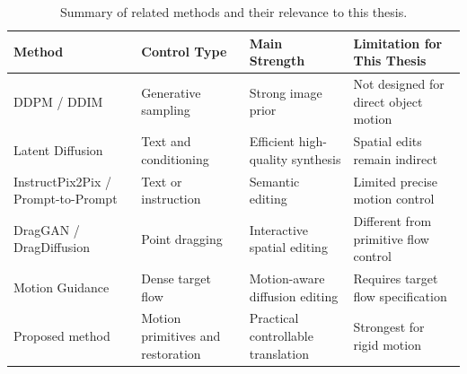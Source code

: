 \begin{table}[t]
  \caption{Summary of related methods and their relevance to this thesis.}
  \centering
  \begin{tabular}{p{1.4in}|p{1.1in}|p{1.3in}|p{1.4in}}
    \hline
    Method & Control Type & Main Strength & Limitation for This Thesis \\ \hline \hline
    DDPM / DDIM & Generative sampling & Strong image prior & Not designed for direct object motion \\ \hline
    Latent Diffusion & Text and conditioning & Efficient high-quality synthesis & Spatial edits remain indirect \\ \hline
    InstructPix2Pix / Prompt-to-Prompt & Text or instruction & Semantic editing & Limited precise motion control \\ \hline
    DragGAN / DragDiffusion & Point dragging & Interactive spatial editing & Different from primitive flow control \\ \hline
    Motion Guidance & Dense target flow & Motion-aware diffusion editing & Requires target flow specification \\ \hline
    Proposed method & Motion primitives and restoration & Practical controllable translation & Strongest for rigid motion \\ \hline
  \end{tabular}
  \label{tab:related-work-summary}
\end{table}

\FloatBarrier
